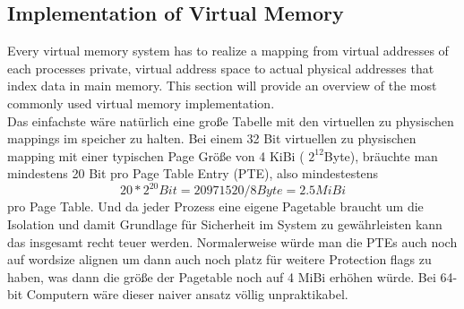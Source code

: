 \subsection{Implementation of Virtual Memory}
Every virtual memory system has to realize a mapping from virtual addresses of each processes
private, virtual address space to actual physical addresses that index data in main memory.
This section will provide an overview of the most commonly used virtual memory implementation.\\

Das einfachste wäre natürlich eine große Tabelle mit den virtuellen zu physischen mappings im
speicher zu halten. Bei einem 32 Bit virtuellen zu physischen mapping mit einer typischen Page Größe
von 4 KiBi ( $ 2^{12}$Byte), bräuchte man mindestens 20 Bit pro Page Table Entry (PTE), also mindestestens
\[ 20 * 2^{20} Bit = 20971520 / 8 Byte = 2.5 MiBi \]
pro Page Table. Und da jeder Prozess eine eigene Pagetable braucht um die Isolation und damit Grundlage
für Sicherheit im System zu gewährleisten kann das insgesamt recht teuer werden.
Normalerweise würde man die PTEs auch noch auf wordsize alignen um dann auch noch platz für weitere
Protection flags zu haben, was dann die größe der Pagetable noch auf 4 MiBi erhöhen würde.
Bei 64-bit Computern wäre dieser naiver ansatz völlig unpraktikabel.
\\


